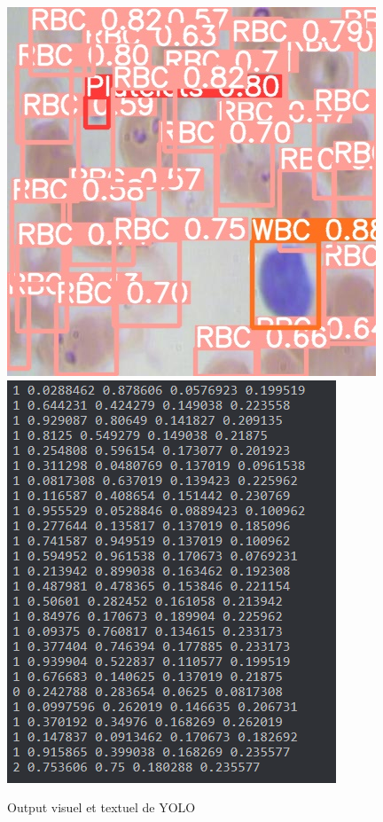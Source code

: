 \begin{figure}[!h]
    \centering
    \includegraphics[scale=0.4]{images/yolo out.jpg}
    \includegraphics[scale=0.4]{images/yolo out txt.png}
    \caption{Output visuel et textuel de YOLO}
    \label{fig:yolo-out}
\end{figure}

\newpage
